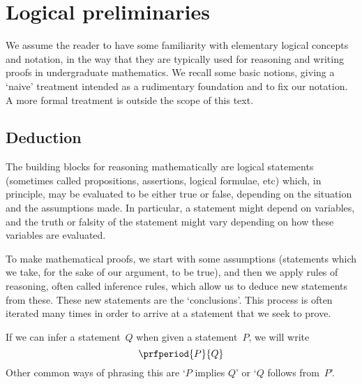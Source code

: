 
\section{Logical preliminaries}
\label{sec:logical-prelim}


We assume the reader to have some familiarity with elementary logical concepts and notation, in the way that they are typically used for reasoning and writing proofs in undergraduate mathematics.
We recall some basic notions, giving a `naive' treatment intended as a rudimentary foundation and to fix our notation.
A more formal treatment is outside the scope of this text.


\subsection{Deduction}

The building blocks for reasoning mathematically are logical statements (sometimes called propositions, assertions, logical formulae, etc) which, in principle, may be evaluated to be either true or false, depending on the situation and the assumptions made.
In particular, a statement might depend on variables, and the truth or falsity of the statement might vary depending on how these variables are evaluated.

To make mathematical proofs, we start with some assumptions (statements which we take, for the sake of our argument, to be true), and then we apply rules of reasoning, often called inference rules, which allow us to deduce new statements from these.
These new statements are the `conclusions'.
This process is often iterated many times in order to arrive at a statement that we seek to prove.

If we can infer a statement~$Q$ when given a statement~$P$, we will write
\begin{equation*}
    \prfperiod
    {P}{Q}
\end{equation*}
Other common ways of phrasing this are `$P$ implies $Q$' or `$Q$ follows from~$P$'.

